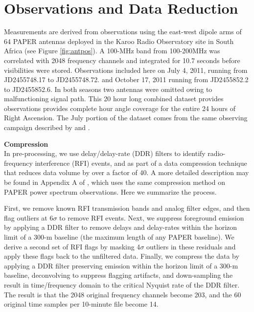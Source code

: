 \documentclass[preprint]{aastex}
\begin{document}
 
 \section{Observations and Data Reduction}
 \label{sec:Observations}

 Measurements are derived from observations using  the east-west dipole arms of
64 PAPER antennas deployed in the Karoo Radio Observatory site in South Africa
(see Figure \ref{fig:antpos}).  A 100-MHz band from 100-200MHz was correlated
with 2048 frequency channels and integrated for 10.7 seconds before
visibilities were stored.  Observations included here on  July 4, 2011, running
from JD2455748.17 to JD2455748.72. and October 17, 2011 running from
JD2455852.2 to JD2455852.6.  In both seasons two antennas were omitted owing to
malfunctioning signal path. This 20 hour long combined dataset provides
observations provides complete hour angle coverage for the entire 24 hours of
Right Ascension. The July portion of the dataset comes from the same observing
campaign described by \cite{Pober:2013p9567} and \cite{Stefan:2012p9707}. 

\textbf{Compression}\\

In pre-processing, we use delay/delay-rate (DDR) filters
\citep{Parsons:2009p7859} to identify radio-frequency interference (RFI)
events, and as part of a data compression technique that reduces data volume by
over a factor of 40.  A more detailed description may be found in Appendix A of
\cite{Parsons2013b}, which uses the same compression method on PAPER power
spectrum observations. Here we summarize the process.

First, we remove known RFI transmission bands and analog filter edges, and then
flag outliers at 6$\sigma$ to remove RFI events.  Next, we suppress foreground
emission by applying a DDR filter to remove delays and delay-rates within the
horizon limit of a 300-m baseline (the maximum length of any PAPER baseline).
We derive a second set of RFI flags by masking 4$\sigma$ outliers in these
residuals and apply these flags back to the unfiltered data.  Finally, we
compress the data by applying a DDR filter preserving emission within the
horizon limit of a 300-m baseline, deconvolving to suppress flagging artifacts,
and down-sampling the result in time/frequency domain to the critical Nyquist
rate of the DDR filter.  The result is that the 2048 original frequency
channels become 203, and the 60 original time samples per 10-minute file become
14. 
\end{document}
